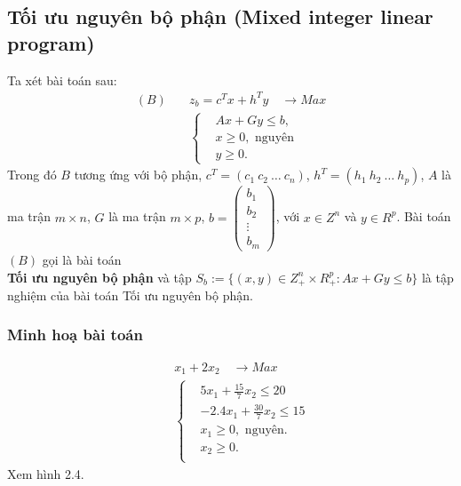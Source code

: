 \documentclass[12pt,a4paper]{report}
\begin{document}
\subsection*{Tối ưu nguyên bộ phận (Mixed integer linear program)}
Ta xét bài toán sau:
\begin{equation}\label{B}
\begin{split}
(B) \quad & z_b=c^Tx+h^Ty \quad \longrightarrow Max \\
          & \left\{\begin{split}
            &Ax+Gy \leq  b, \\
            &x \geq 0, \text{ nguyên} \\
            &y \geq 0.
            \end{split}\right.    
\end{split}
\end{equation}    
Trong đó $B$ tương ứng với bộ phận, $c^T=(c_1 \: c_2 \: \ldots \: c_n)$, $h^T=(h_1 \: h_2 \: \ldots \: h_p)$, $A$ là ma trận $m\times n$, $G$ là ma trận $m\times p$, $b=\begin{pmatrix}
    b_1 \\
    b_2 \\
    \vdots \\
    b_m
    \end{pmatrix}$, với $x\in Z^n$ và $y\in R^p$.
Bài toán $(B)$ gọi là bài toán \\ \textbf{Tối ưu nguyên bộ phận} và tập $S_b:=\{(x,y)\in Z^n_+\times R^p_+: Ax+Gy\leq b\}$ là tập nghiệm của bài toán Tối ưu nguyên bộ phận.

\subsubsection*{Minh hoạ bài toán}
   \begin{equation}
        \begin{split}
        \quad & x_1 + 2x_2 \quad \longrightarrow Max \\
                    & \left\{\begin{split}
                    & 5x_1 + \frac{15}{7}x_2 \leq 20 \\
                    & -2.4x_1 + \frac{30}{7}x_2 \leq 15 \\
                    &x_1 \geq 0, \text{ nguyên}. \\
                    &x_2 \geq 0. \\
                    \end{split}\right.    
        \end{split}
        \end{equation}            
Xem hình 2.4.
\end{document}
